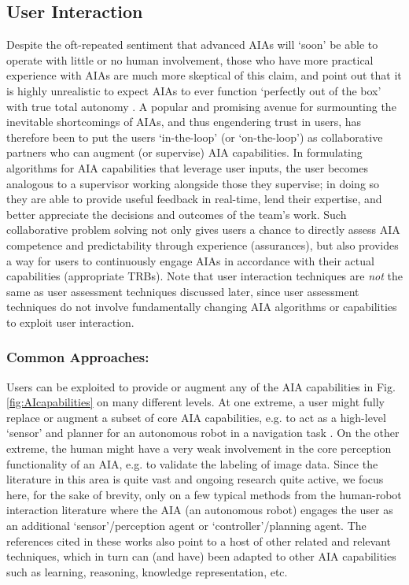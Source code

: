 \subsection{User Interaction} \label{sec:user_interaction}
Despite the oft-repeated sentiment that advanced AIAs will `soon' be able to operate with little or no human involvement, those who have more practical experience with AIAs are much more skeptical of this claim, and point out that it is highly unrealistic to expect AIAs to ever function `perfectly out of the box' with true total autonomy \cite{Bradshaw2013-ck}. 
A popular and promising avenue for surmounting the inevitable shortcomings of AIAs, and thus engendering trust in users, has therefore been to put the users `in-the-loop' (or `on-the-loop') as collaborative partners who can augment (or supervise) AIA capabilities. 
In formulating algorithms for AIA capabilities that leverage user inputs, the user becomes analogous to a supervisor working alongside those they supervise; in doing so they are able to provide useful feedback in real-time, lend their expertise, and better appreciate the decisions and outcomes of the team's work. Such collaborative problem solving not only gives users a chance to directly assess AIA competence and predictability through experience (assurances), but also provides a way for users to continuously engage AIAs in accordance with their actual capabilities (appropriate TRBs). 
Note that user interaction techniques are \emph{not} the same as user assessment techniques discussed later, since user assessment techniques do not involve fundamentally changing AIA algorithms or capabilities to exploit user interaction.


\subsubsection{Common Approaches:} 
Users can be exploited to provide or augment any of the AIA capabilities in Fig. \ref{fig:AIcapabilities} on many different levels. 
At one extreme, a user might fully replace or augment a subset of core AIA capabilities, e.g. to act as a high-level `sensor' and planner for an autonomous robot in a navigation task \cite{Kaupp2008-yr}.  
On the other extreme, the human might have a very weak involvement in the core perception functionality of an AIA, e.g. to validate the labeling of image data. 
Since the literature in this area is quite vast and ongoing research quite active, we focus here, for the sake of brevity, only on a few typical methods from the human-robot interaction literature where the AIA (an autonomous robot) engages the user as an additional `sensor'/perception agent or `controller'/planning agent. The references cited in these works also point to a host of other related and relevant techniques, which in turn can (and have) been adapted to other AIA capabilities such as learning, reasoning, knowledge representation, etc.

